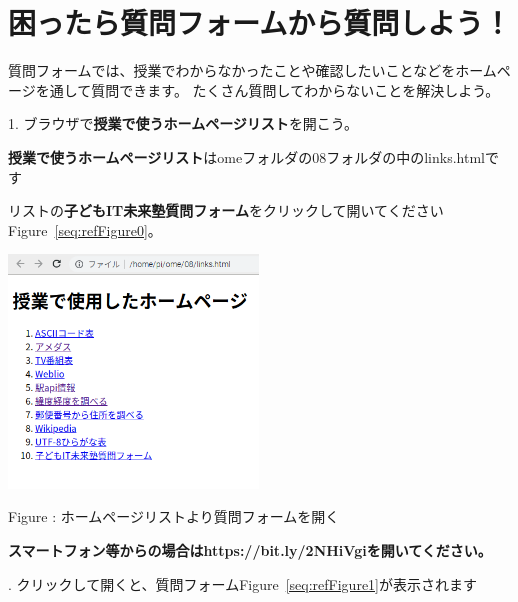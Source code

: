 \documentclass[a4paper,12pt,dvipdfmx]{jarticle}
\newcounter{Figure}
\renewcommand\theFigure{\arabic{Figure}}
\begin{document}
\section{困ったら質問フォームから質問しよう！}
質問フォームでは、授業でわからなかったことや確認したいことなどをホームページを通して質問できます。
たくさん質問してわからないことを解決しよう。

1.
ブラウザで\textbf{授業で使うホームページリスト}を開こう。

\textbf{授業で使うホームページリスト}はomeフォルダの08フォルダの中のlinks.htmlです

リストの\textbf{子どもIT未来塾質問フォーム}をクリックして開いてくださいFigure~\ref{seq:refFigure0}。



\begin{center}
\begin{minipage}{10.88cm}


\includegraphics[width=6.638cm,height=6.204cm]{textbook-img017.png}


\bigskip


\bigskip

Figure {\theFigure\label{seq:refFigure0}}:
ホームページリストより質問フォームを開く
\end{minipage}
\end{center}
{\bfseries
スマートフォン等からの場合はhttps://bit.ly/2NHiVgiを開いてください。}


\bigskip

.
クリックして開くと、質問フォームFigure~\ref{seq:refFigure1}が表示されます
\end{document}
